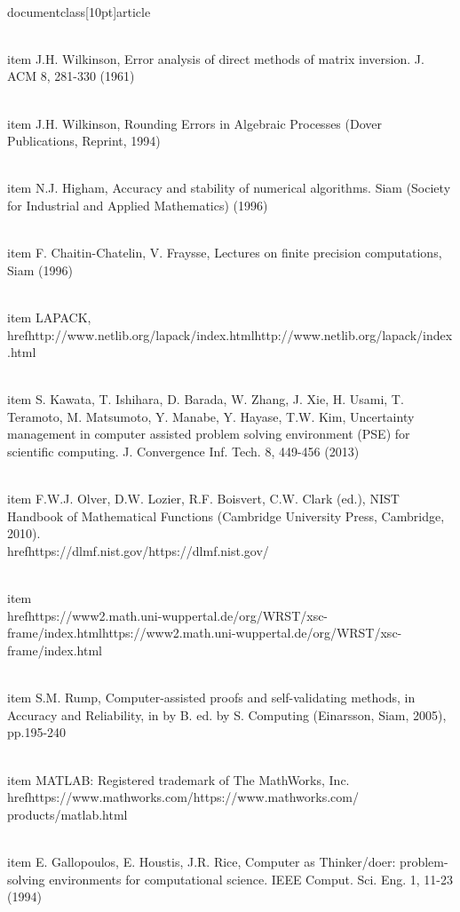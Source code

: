 \\documentclass[10pt]{article}
\begin{document}
  \\item J.H. Wilkinson, Error analysis of direct methods of matrix inversion. J. ACM 8, 281-330 (1961)

  \\item J.H. Wilkinson, Rounding Errors in Algebraic Processes (Dover Publications, Reprint, 1994)

  \\item N.J. Higham, Accuracy and stability of numerical algorithms. Siam (Society for Industrial and Applied Mathematics) (1996)

  \\item F. Chaitin-Chatelin, V. Fraysse, Lectures on finite precision computations, Siam (1996)

  \\item LAPACK, \\href{http://www.netlib.org/lapack/index.html}{http://www.netlib.org/lapack/index.html}

  \\item S. Kawata, T. Ishihara, D. Barada, W. Zhang, J. Xie, H. Usami, T. Teramoto, M. Matsumoto, Y. Manabe, Y. Hayase, T.W. Kim, Uncertainty management in computer assisted problem solving environment (PSE) for scientific computing. J. Convergence Inf. Tech. 8, 449-456 (2013)

  \\item F.W.J. Olver, D.W. Lozier, R.F. Boisvert, C.W. Clark (ed.), NIST Handbook of Mathematical Functions (Cambridge University Press, Cambridge, 2010). \\href{https://dlmf.nist.gov/}{https://dlmf.nist.gov/}

  \\item \\href{https://www2.math.uni-wuppertal.de/org/WRST/xsc-frame/index.html}{https://www2.math.uni-wuppertal.de/org/WRST/xsc-frame/index.html}

  \\item S.M. Rump, Computer-assisted proofs and self-validating methods, in Accuracy and Reliability, in by B. ed. by S. Computing (Einarsson, Siam, 2005), pp.195-240

  \\item MATLAB: Registered trademark of The MathWorks, Inc. \\href{https://www.mathworks.com/}{https://www.mathworks.com/} products/matlab.html

  \\item E. Gallopoulos, E. Houstis, J.R. Rice, Computer as Thinker/doer: problem-solving environments for computational science. IEEE Comput. Sci. Eng. 1, 11-23 (1994)
\end{document}
